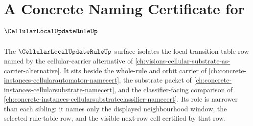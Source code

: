 \chapter{A Concrete Naming Certificate for $\CellularLocalUpdateRuleUp$}
\label{ch:concrete-instances-cellularlocalupdaterule-namecert}

The $\CellularLocalUpdateRuleUp$ surface isolates the local transition-table row named by the cellular-carrier alternative of \autoref{ch:visions-cellular-substrate-as-carrier-alternative}. It sits beside the whole-rule and orbit carrier of \autoref{ch:concrete-instances-cellularautomaton-namecert}, the substrate packet of \autoref{ch:concrete-instances-cellularsubstrate-namecert}, and the classifier-facing comparison of \autoref{ch:concrete-instances-cellularsubstrateclassifier-namecert}. Its role is narrower than each sibling: it names only the displayed neighbourhood window, the selected rule-table row, and the visible next-row cell certified by that row.



